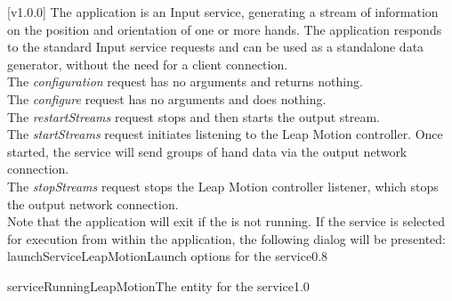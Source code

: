 [v1.0.0]
The  application is an Input service,
generating a stream of information on the position and orientation of one or more hands.
The application responds to the standard Input service requests and can be used as a
standalone data generator, without the need for a client connection.\\

The \emph{configuration} request has no arguments and returns nothing.\\

The \emph{configure} request has no arguments and does nothing.\\

The \emph{restartStreams} request stops and then starts the output stream.\\

The \emph{startStreams} request initiates listening to the Leap Motion controller.
Once started, the service will send groups of hand data via the output \yarp{} network
connection.\\

The \emph{stopStreams} request stops the Leap Motion controller listener, which stops the
output \yarp{} network connection.\\ 

Note that the application will exit if the \emph{\RS} is not running.
\insertAppParameters
\insertTagDescription{\LMI}
\insertInputServiceComment
\condPage
\insertStandardServiceCommands
\secondaryEnd
\condPage
{}
If the service is selected for execution from within the \emph{\MMMU} application, the
following dialog will be presented:
%
{launchServiceLeapMotion}{Launch options for the \emph{\LMI} service}{0.8}

%
{serviceRunningLeapMotion}{The \emph{\MMMU} entity for the \emph{\LMI} service}{1.0}
\secondaryEnd
\primaryEnd{}
